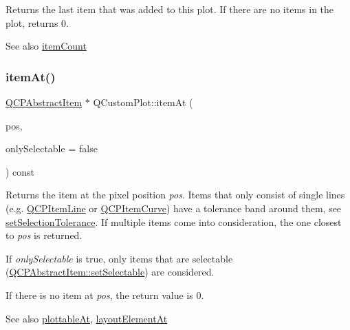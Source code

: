 Returns the last item that was added to this plot. If there are no items in the plot, returns 0.

\begin{DoxySeeAlso}{See also}
\mbox{\hyperlink{class_q_custom_plot_a16025daf0341f9362be3080e404424c2}{item\+Count}} 
\end{DoxySeeAlso}
\mbox{\label{class_q_custom_plot_ac08578e0e6c059c83a8d340ba0038e8e}} 
\subsubsection{\texorpdfstring{item\+At()}{itemAt()}}
{\footnotesize\ttfamily \mbox{\hyperlink{class_q_c_p_abstract_item}{Q\+C\+P\+Abstract\+Item}} $\ast$ Q\+Custom\+Plot\+::item\+At (\begin{DoxyParamCaption}\item[{const Q\+PointF \&}]{pos,  }\item[{bool}]{only\+Selectable = {\ttfamily false} }\end{DoxyParamCaption}) const}

Returns the item at the pixel position {\itshape pos}. Items that only consist of single lines (e.\+g. \mbox{\hyperlink{class_q_c_p_item_line}{Q\+C\+P\+Item\+Line}} or \mbox{\hyperlink{class_q_c_p_item_curve}{Q\+C\+P\+Item\+Curve}}) have a tolerance band around them, see \mbox{\hyperlink{class_q_custom_plot_a4dc31241d7b09680950e19e5f971ed93}{set\+Selection\+Tolerance}}. If multiple items come into consideration, the one closest to {\itshape pos} is returned.

If {\itshape only\+Selectable} is true, only items that are selectable (\mbox{\hyperlink{class_q_c_p_abstract_item_a8a8e32a55bc478b849756a78c2d87fd2}{Q\+C\+P\+Abstract\+Item\+::set\+Selectable}}) are considered.

If there is no item at {\itshape pos}, the return value is 0.

\begin{DoxySeeAlso}{See also}
\mbox{\hyperlink{class_q_custom_plot_acddbbd8b16dd633f0d94e5a736fbd8cf}{plottable\+At}}, \mbox{\hyperlink{class_q_custom_plot_afaa1d304e0287d140fd238e90889ef3c}{layout\+Element\+At}} 
\end{DoxySeeAlso}
\mbox{\label{class_q_custom_plot_ae16b51f52d2b7aebbc7e3e74e6ff2e4b}} 
